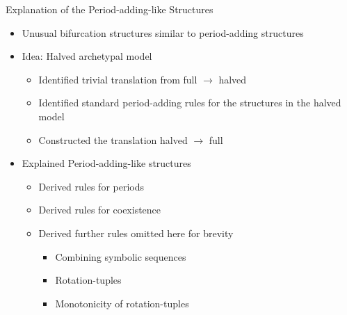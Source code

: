 \begin{frame}{Explanation of the Period-adding-like Structures}
	\begin{itemize}
		\item Unusual bifurcation structures similar to period-adding structures
		      \pause
		\item Idea: Halved archetypal model
		      \begin{itemize}
			      \item Identified trivial translation from full $\to$ halved
			      \item Identified standard period-adding rules for the structures in the halved model
			      \item Constructed the translation halved $\to$ full
		      \end{itemize}
		      \pause
		\item Explained Period-adding-like structures
		      \begin{itemize}
			      \item Derived rules for periods
			      \item Derived rules for coexistence
			      \item Derived further rules omitted here for brevity
			            \begin{itemize}
				            \item Combining symbolic sequences
				            \item Rotation-tuples
				            \item Monotonicity of rotation-tuples
			            \end{itemize}
		      \end{itemize}
	\end{itemize}
\end{frame}
